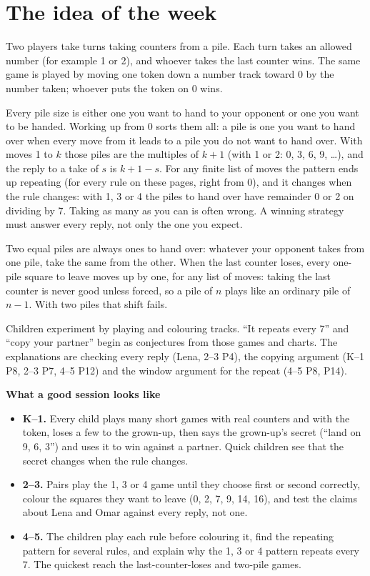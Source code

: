 \documentclass[10pt]{article}
\begin{document}
\section{The idea of the week}

Two players take turns taking counters from a pile. Each turn takes an allowed
number (for example 1 or 2), and whoever takes the last counter wins. The same
game is played by moving one token down a number track toward 0 by the number
taken; whoever puts the token on 0 wins.

Every pile size is either one you want to hand to your opponent or one you
want to be handed. Working up from 0 sorts them all: a pile is one you want to
hand over when every move from it leads to a pile you do not want to hand
over. With moves 1 to $k$ those piles are the multiples of $k+1$ (with 1 or
2: 0, 3, 6, 9, \dots), and the reply to a take of $s$ is $k+1-s$. For any
finite list of moves the pattern ends up repeating (for every rule on these
pages, right from 0), and it changes when the rule changes: with 1, 3 or 4 the
piles to hand over have remainder 0 or 2 on dividing by 7. Taking as many as
you can is often wrong. A winning strategy must answer every reply, not only
the one you expect.

Two equal piles are always ones to hand over: whatever your opponent takes
from one pile, take the same from the other. When the last counter loses,
every one-pile square to leave moves up by one, for any list of moves: taking
the last counter is never good unless forced, so a pile of $n$ plays like an
ordinary pile of $n-1$. With two piles that shift fails.

Children experiment by playing and colouring tracks. ``It repeats every 7'' and
``copy your partner'' begin as conjectures from those games and charts. The
explanations are checking every reply (Lena, 2--3 P4), the copying argument
(K--1 P8, 2--3 P7, 4--5 P12) and the window argument for the repeat (4--5 P8,
P14).

\textbf{What a good session looks like}

\begin{itemize}
\item \textbf{K--1.} Every child plays many short games with real counters and
with the token, loses a few to the grown-up, then says the grown-up's secret
(``land on 9, 6, 3'') and uses it to win against a partner. Quick children see
that the secret changes when the rule changes.
\item \textbf{2--3.} Pairs play the 1, 3 or 4 game until they choose first or
second correctly, colour the squares they want to leave (0, 2, 7, 9, 14, 16),
and test the claims about Lena and Omar against every reply, not one.
\item \textbf{4--5.} The children play each rule before colouring it, find
the repeating pattern for several rules, and explain why the 1, 3 or 4 pattern
repeats every 7. The quickest reach the last-counter-loses and two-pile games.
\end{itemize}
\end{document}
